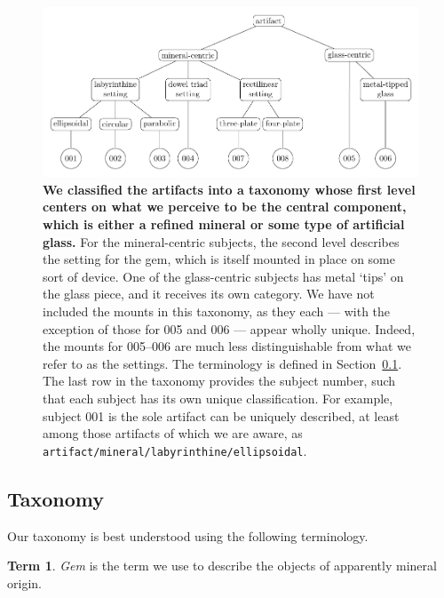 \documentclass[10pt]{article}
\theoremstyle{definition}
\newtheorem{term}{Term}
\begin{document}
\begin{figure}
\includegraphics[width=1.0\textwidth]{taxonomy.pdf}
\caption{\label{fig:taxonomy}\textbf{We classified the artifacts into a taxonomy whose first level centers on what we perceive to be the central component, which is either a refined mineral or some type of artificial glass.} For the mineral-centric subjects, the second level describes the setting for the gem, which is itself mounted in place on some sort of device. One of the glass-centric subjects has metal `tips' on the glass piece, and it receives its own category. We have not included the mounts in this taxonomy, as they each --- with the exception of those for 005 and 006 --- appear wholly unique. Indeed, the mounts for 005--006 are much less distinguishable from what we refer to as the settings. The terminology is defined in Section~\ref{sec:taxonomy}. The last row in the taxonomy provides the subject number, such that each subject has its own unique classification. For example, subject 001 is the sole artifact can be uniquely described, at least among those artifacts of which we are aware, as \texttt{artifact/mineral/labyrinthine/ellipsoidal}. }
\end{figure}


\subsection{Taxonomy}\label{sec:taxonomy}
Our taxonomy is best understood using the following terminology.

\begin{term}
\emph{Gem} is the term we use to describe the objects of apparently mineral origin.
\end{term}
\end{document}
